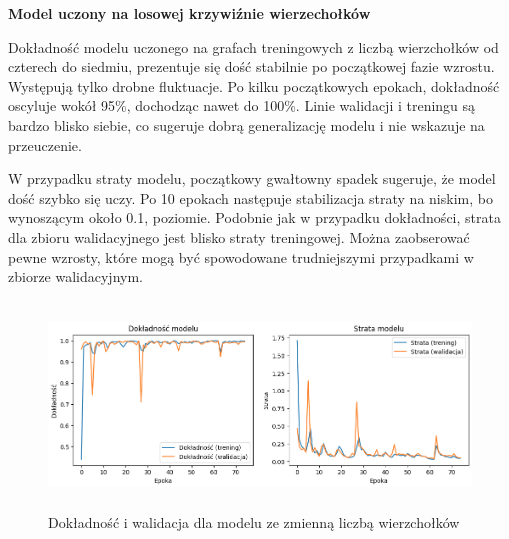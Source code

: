 


\textbf{Model uczony na losowej krzywiźnie wierzechołków}

Dokładność modelu uczonego na grafach treningowych z liczbą wierzchołków od czterech do siedmiu,
prezentuje się dość stabilnie po początkowej fazie wzrostu. Występują tylko drobne fluktuacje.
Po kilku początkowych epokach, dokładność oscyluje wokół 95\%, dochodząc nawet do 100\%.
Linie walidacji i treningu są bardzo blisko siebie, co sugeruje dobrą generalizację modelu
i nie wskazuje na przeuczenie.

W przypadku straty modelu, początkowy gwałtowny spadek sugeruje, że model dość szybko się uczy.
Po 10 epokach następuje stabilizacja straty na niskim, bo wynoszącym około 0.1, poziomie.
Podobnie jak w przypadku dokładności, strata dla zbioru walidacyjnego jest blisko straty treningowej.
Można zaobserować pewne wzrosty, które mogą być spowodowane trudniejszymi przypadkami w zbiorze walidacyjnym.

\begin{figure}[ht]
	\centering
	\includegraphics[height=5.5cm]{resources/tests/images/v3/multiple_edges_img.png}
	\caption{Dokładność i walidacja dla modelu ze zmienną liczbą wierzchołków}
	\label{Fig:tests-var-0a}
\end{figure}
\FloatBarrier

